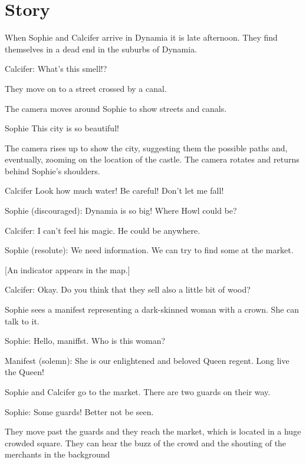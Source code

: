 \section{Story}

When Sophie and Calcifer arrive in Dynamia it is late afternoon. They find themselves in a dead end in the suburbs of Dynamia.

Calcifer: What’s this smell!?

They move on to a street crossed by a canal.

\begin{screenplay}

The camera  moves around Sophie to show streets and canals. 

\begin{dialogue}[amazed]{Sophie}
This city is so beautiful!
\end{dialogue}

The camera rises up to show the city, suggesting them the possible paths and, eventually,  zooming on the location of the castle. The camera rotates and returns behind Sophie's shoulders. 

\begin{dialogue}[worried]{Calcifer}
Look how much water! Be careful! Don’t let me fall!
\end{dialogue}
\end{screenplay}

Sophie (discouraged): Dynamia is so big! Where Howl could be?

Calcifer: I can’t feel his magic. He could be anywhere.

Sophie (resolute): We need information. We can try to find some at the market. 

[An indicator appears in the map.]

Calcifer: Okay. Do you think that they sell also a little bit of wood?

Sophie sees a manifest representing a dark-skinned woman with a crown. She can talk to it.

Sophie: Hello, maniffst. Who is this woman?

Manifest (solemn): She is our enlightened and beloved Queen regent. Long live the Queen!

Sophie and Calcifer go to the market. There are two guards on their way.

Sophie: Some guards! Better not be seen.

They move past the guards and they reach the market, which is located in a huge crowded square. They can hear the buzz of the crowd and the shouting of the merchants in the background

